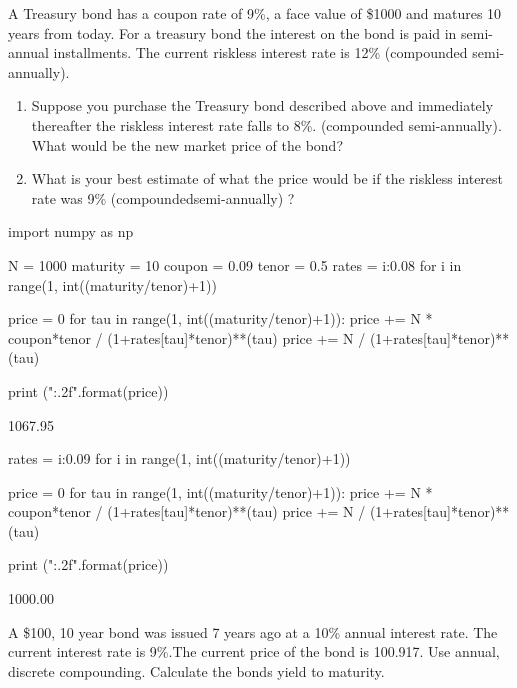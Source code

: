 \begin{question}
A Treasury bond has a coupon rate of 9\%, a face value of \$1000 and matures 10 years from today. For a treasury bond the interest on the bond is paid in semi-annual installments. The current riskless interest rate is 12\% (compounded semi-annually).
\begin{enumerate}
\item Suppose you purchase the Treasury bond described above and immediately thereafter the riskless interest rate falls to 8\%. (compounded semi-annually). What would be the new market price of the bond?
\item What is your best estimate of what the price would be if the riskless interest rate was 9\% (compoundedsemi-annually) ?
\end{enumerate}
\end{question}

\cprotEnv\begin{solution}
\begin{ipython}
import numpy as np

N = 1000
maturity = 10
coupon = 0.09
tenor = 0.5
rates = {i:0.08 for i in range(1, int((maturity/tenor)+1))}

price = 0
for tau in range(1, int((maturity/tenor)+1)):
    price += N * coupon*tenor / (1+rates[tau]*tenor)**(tau)
price += N / (1+rates[tau]*tenor)**(tau) 

print ("{:.2f}".format(price))
\end{ipython}
\begin{ioutput}
1067.95
\end{ioutput}

\begin{ipython}
rates = {i:0.09 for i in range(1, int((maturity/tenor)+1))}
	
price = 0
for tau in range(1, int((maturity/tenor)+1)):
    price += N * coupon*tenor / (1+rates[tau]*tenor)**(tau)
price += N / (1+rates[tau]*tenor)**(tau) 
	
print ("{:.2f}".format(price))
\end{ipython}
\begin{ioutput}
1000.00
\end{ioutput}
\end{solution}

\begin{question}
A \$100, 10 year bond was issued 7 years ago at a 10\% annual interest rate. The current interest rate is 9\%.The current price of the bond is 100.917. Use annual, discrete compounding. Calculate the bonds yield to maturity.
\end{question}


